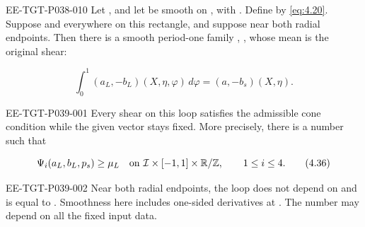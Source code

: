 \begin{lemma}\label{lem:4.11}
\begin{EESegment}{EE-TGT-P038-010}
Let , and let
 be smooth on
, with
. Define  by
\eqref{eq:4.20}. Suppose  and
 everywhere on this rectangle, and suppose
 near both radial endpoints. Then there is a smooth
period-one family ,
, whose mean is the original shear:
\end{EESegment}
\[
\int_0^1(a_L,-b_L)(X,\eta,\varphi)\,d\varphi=(a,-b_s)(X,\eta).
\]
\begin{EESegment}{EE-TGT-P039-001}
Every shear on this loop satisfies the admissible cone condition while the given vector
 stays fixed. More precisely, there is a number
 such that
\end{EESegment}
\begin{equation}
\Psi_i(a_L,b_L,p_s)\ge\mu_L
\quad\hbox{on }\mathcal I\times[-1,1]\times\mathbb R/\mathbb Z,
\qquad 1\le i\le4.
\tag{4.36}\label{eq:4.36}
\end{equation}
\begin{EESegment}{EE-TGT-P039-002}
Near both radial endpoints, the loop does not depend on
 and is equal to
. Smoothness here includes one-sided derivatives at
. The number
 may depend on all the fixed input data.
\end{EESegment}
\end{lemma}

